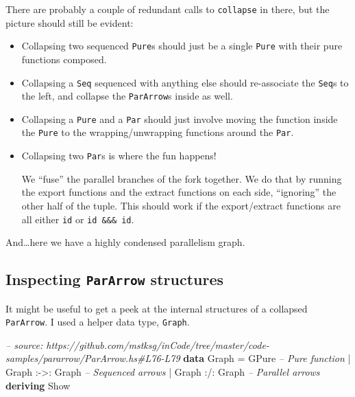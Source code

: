 \documentclass[]{article}
\newenvironment{Shaded}{\begin{snugshade}}{\end{snugshade}}
\newcommand{\CommentTok}[1]{\textcolor[rgb]{0.56,0.35,0.01}{\textit{#1}}}
\newcommand{\DataTypeTok}[1]{\textcolor[rgb]{0.13,0.29,0.53}{#1}}
\newcommand{\FunctionTok}[1]{\textcolor[rgb]{0.00,0.00,0.00}{#1}}
\newcommand{\KeywordTok}[1]{\textcolor[rgb]{0.13,0.29,0.53}{\textbf{#1}}}
\begin{document}
There are probably a couple of redundant calls to \texttt{collapse} in there,
but the picture should still be evident:

\begin{itemize}
\item
  Collapsing two sequenced \texttt{Pure}s should just be a single \texttt{Pure}
  with their pure functions composed.
\item
  Collapsing a \texttt{Seq} sequenced with anything else should re-associate the
  \texttt{Seq}s to the left, and collapse the \texttt{ParArrow}s inside as well.
\item
  Collapsing a \texttt{Pure} and a \texttt{Par} should just involve moving the
  function inside the \texttt{Pure} to the wrapping/unwrapping functions around
  the \texttt{Par}.
\item
  Collapsing two \texttt{Par}s is where the fun happens!

  We ``fuse'' the parallel branches of the fork together. We do that by running
  the export functions and the extract functions on each side, ``ignoring'' the
  other half of the tuple. This should work if the export/extract functions are
  all either \texttt{id} or \texttt{id\ \&\&\&\ id}.
\end{itemize}

And\ldots{}here we have a highly condensed parallelism graph.

\hypertarget{inspecting-pararrow-structures}{%
\subsection{\texorpdfstring{Inspecting \texttt{ParArrow}
structures}{Inspecting ParArrow structures}}\label{inspecting-pararrow-structures}}

It might be useful to get a peek at the internal structures of a collapsed
\texttt{ParArrow}. I used a helper data type, \texttt{Graph}.

\begin{Shaded}
\begin{Highlighting}[]
\CommentTok{-- source: https://github.com/mstksg/inCode/tree/master/code-samples/pararrow/ParArrow.hs#L76-L79}
\KeywordTok{data} \DataTypeTok{Graph} \FunctionTok{=} \DataTypeTok{GPure}                  \CommentTok{-- Pure function}
           \FunctionTok{|} \DataTypeTok{Graph} \FunctionTok{:->:} \DataTypeTok{Graph}       \CommentTok{-- Sequenced arrows}
           \FunctionTok{|} \DataTypeTok{Graph} \FunctionTok{:/:} \DataTypeTok{Graph}        \CommentTok{-- Parallel arrows}
           \KeywordTok{deriving} \DataTypeTok{Show}
\end{Highlighting}
\end{Shaded}
\end{document}
